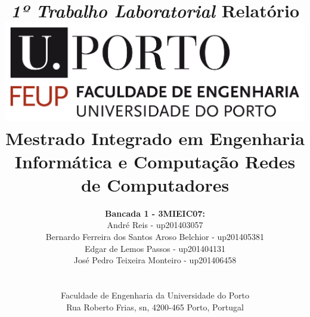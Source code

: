 \documentclass[11pt]{article}
\begin{document}
\setlength{\textwidth}{16cm}
\setlength{\textheight}{22cm}

\title{\Huge\textbf{\textit{1º Trabalho Laboratorial}}\linebreak\linebreak
\Large\textbf{Relatório}\linebreak
\linebreak\linebreak
\includegraphics[scale=0.1]{res/images/feup-logo.png}\linebreak\linebreak
\linebreak\linebreak
\Large{Mestrado Integrado em Engenharia Informática e Computação} \linebreak\linebreak
\Large{Redes de Computadores}\linebreak
}

\author{\textbf{Bancada 1 - 3MIEIC07:}\\
André Reis - up201403057 \\
Bernardo Ferreira dos Santos Aroso Belchior - up201405381 \\
Edgar de Lemos Passos - up201404131 \\
José Pedro Teixeira Monteiro - up201406458 \\
\linebreak\linebreak \\
 \\ Faculdade de Engenharia da Universidade do Porto \\ Rua Roberto Frias, s\/n, 4200-465 Porto, Portugal \linebreak\linebreak\linebreak
\linebreak\linebreak\vspace{1cm}}

\maketitle
\thispagestyle{empty}
\end{document}
